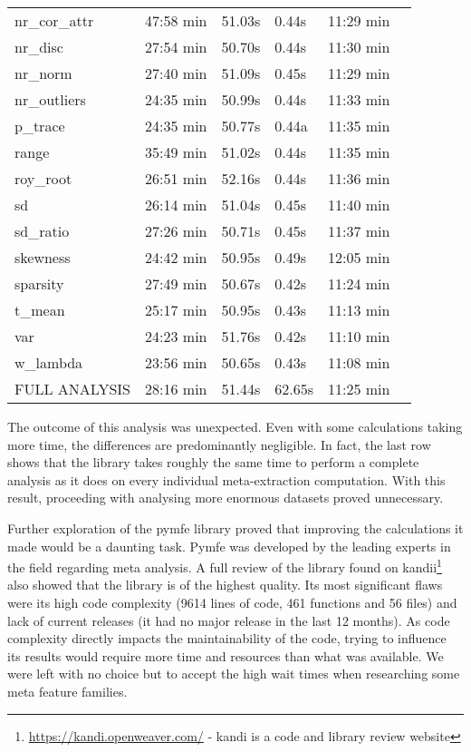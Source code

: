 \begin{table}[t!]
\begin{tabular}{llllll}
        nr\_cor\_attr & 47:58 min & 51.03s & 0.44s & 11:29 min\\
        nr\_disc & 27:54 min & 50.70s & 0.44s & 11:30 min\\
        nr\_norm & 27:40 min & 51.09s & 0.45s & 11:29 min \\
        nr\_outliers & 24:35 min & 50.99s & 0.44s & 11:33 min\\
        p\_trace & 24:35 min& 50.77s & 0.44a& 11:35 min\\
        range & 35:49 min & 51.02s & 0.44s & 11:35 min\\
        roy\_root & 26:51 min& 52.16s & 0.44s & 11:36 min\\
        sd & 26:14 min & 51.04s & 0.45s & 11:40 min\\
        sd\_ratio & 27:26 min & 50.71s & 0.45s & 11:37 min\\
        skewness & 24:42 min & 50.95s & 0.49s & 12:05 min\\
        sparsity & 27:49 min & 50.67s & 0.42s & 11:24 min \\
        t\_mean & 25:17 min & 50.95s & 0.43s & 11:13 min\\
        var & 24:23 min & 51.76s & 0.42s & 11:10 min\\
        w\_lambda & 23:56 min & 50.65s & 0.43s & 11:08 min\\
        FULL ANALYSIS & 28:16 min& 51.44s & 62.65s & 11:25 min\\
        \hline
  \end{tabular}
  \label{tab:stat_analysis_time}
\end{table}

The outcome of this analysis was unexpected. Even with some calculations taking more time, the differences are predominantly negligible. In fact, the last row shows that the library takes roughly the same time to perform a complete analysis as it does on every individual meta-extraction computation. With this result, proceeding with analysing more enormous datasets proved unnecessary.

Further exploration of the pymfe library proved that improving the calculations it made would be a daunting task. Pymfe was developed by \citet*{alcobacca2020mfe} the leading experts in the field regarding meta analysis. A full review of the library found on kandii\footnote{\href{https://kandi.openweaver.com/python/ealcobaca/pymfe}{https://kandi.openweaver.com/} - kandi is a code and library review website} also showed that the library is of the highest quality. Its most significant flaws were its high code complexity (9614 lines of code, 461 functions and 56 files) and lack of current releases (it had no major release in the last 12 months). As code complexity directly impacts the maintainability of the code, trying to influence its results would require more time and resources than what was available. We were left with no choice but to accept the high wait times when researching some meta feature families.

